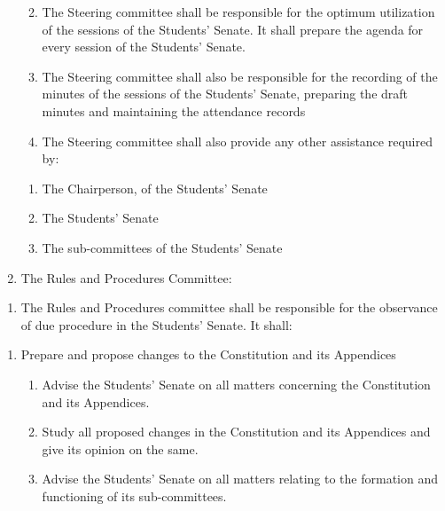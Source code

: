 \begin{enumerate}
  \begin{enumerate}
  \def\labelenumii{\alph{enumii}.}
  \item
    The Steering committee shall be responsible for the optimum
    utilization of the sessions of the Students' Senate. It shall
    prepare the agenda for every session of the Students' Senate.
  \item
    The Steering committee shall also be responsible for the recording
    of the minutes of the sessions of the Students' Senate, preparing
    the draft minutes and maintaining the attendance records
  \item
    The Steering committee shall also provide any other assistance
    required by:
  \end{enumerate}

  \begin{enumerate}
  \def\labelenumii{\arabic{enumii}.}
  \item
    The Chairperson, of the Students' Senate
  \item
    The Students' Senate
  \item
    The sub-committees of the Students' Senate
  \end{enumerate}
\item
  The Rules and Procedures Committee:
\end{enumerate}

\begin{enumerate}
\def\labelenumi{\alph{enumi}.}
\itemsep1pt\parskip0pt
\item
  The Rules and Procedures committee shall be responsible for the
  observance of due procedure in the Students' Senate. It shall:
\end{enumerate}

\begin{enumerate}
\def\labelenumi{\arabic{enumi}.}
\item
  Prepare and propose changes to the Constitution and its Appendices

  \begin{enumerate}
  \def\labelenumii{\arabic{enumii}.}
  \setcounter{enumii}{1}
  \item
    Advise the Students' Senate on all matters concerning the
    Constitution and its Appendices.
  \item
    Study all proposed changes in the Constitution and its Appendices
    and give its opinion on the same.
  \item
    Advise the Students' Senate on all matters relating to the formation
    and functioning of its sub-committees.
  \end{enumerate}
\end{enumerate}

